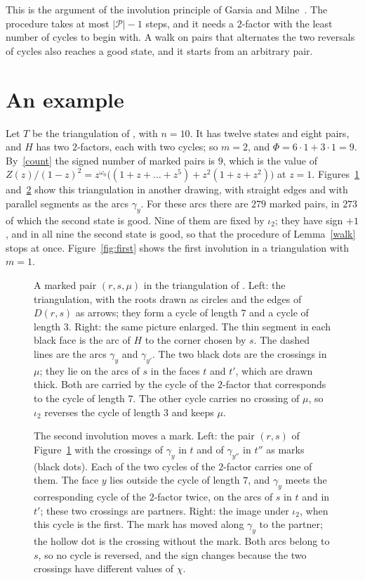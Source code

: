 \documentclass[a4paper]{amsart}
\newcommand{\cP}{\mathcal P}
\begin{document}
This is the argument of the involution principle of Garsia and Milne~\cite{GM}.
The procedure takes at most $|\cP|-1$ steps, and it needs a $2$-factor with the least number of cycles to begin with.
A walk on pairs that alternates the two reversals of cycles also reaches a good state, and it starts from an arbitrary pair.

\section{An example}

Let $T$ be the triangulation of \cite[Figure~2]{P}, with $n=10$.
It has twelve states and eight pairs, and $H$ has two $2$-factors, each with two cycles; so $m=2$, and $\Phi=6\cdot1+3\cdot1=9$.
By~\eqref{count} the signed number of marked pairs is $9$, which is the value of $Z(z)/(1-z)^2=z^{\omega_0}\bigl((1+z+\dots+z^5)+z^2(1+z+z^2)\bigr)$ at $z=1$.
Figures~\ref{fig:marked} and~\ref{fig:second} show this triangulation in another drawing, with straight edges and with parallel segments as the arcs $\gamma_y$.
For these arcs there are $279$ marked pairs, in $273$ of which the second state is good.
Nine of them are fixed by $\iota_2$; they have sign $+1$, and in all nine the second state is good, so that the procedure of Lemma~\ref{walk} stops at once.
Figure~\ref{fig:first} shows the first involution in a triangulation with $m=1$.

\begin{figure}[tbp]
\centering

\caption{A marked pair $(r,s,\mu)$ in the triangulation of \cite[Figure~2]{P}. Left: the triangulation, with the roots drawn as circles and the edges of $D(r,s)$ as arrows; they form a cycle of length $7$ and a cycle of length $3$. Right: the same picture enlarged. The thin segment in each black face is the arc of $H$ to the corner chosen by $s$. The dashed lines are the arcs $\gamma_y$ and $\gamma_{y'}$. The two black dots are the crossings in $\mu$; they lie on the arcs of $s$ in the faces $t$ and $t'$, which are drawn thick. Both are carried by the cycle of the $2$-factor that corresponds to the cycle of length $7$. The other cycle carries no crossing of $\mu$, so $\iota_2$ reverses the cycle of length $3$ and keeps $\mu$.}
\label{fig:marked}
\end{figure}

\begin{figure}[tbp]
\centering

\caption{The second involution moves a mark. Left: the pair $(r,s)$ of Figure~\ref{fig:marked} with the crossings of $\gamma_y$ in $t$ and of $\gamma_{y''}$ in $t''$ as marks (black dots). Each of the two cycles of the $2$-factor carries one of them. The face $y$ lies outside the cycle of length $7$, and $\gamma_y$ meets the corresponding cycle of the $2$-factor twice, on the arcs of $s$ in $t$ and in $t'$; these two crossings are partners. Right: the image under $\iota_2$, when this cycle is the first. The mark has moved along $\gamma_y$ to the partner; the hollow dot is the crossing without the mark. Both arcs belong to $s$, so no cycle is reversed, and the sign changes because the two crossings have different values of $\chi$.}
\label{fig:second}
\end{figure}
\end{document}
